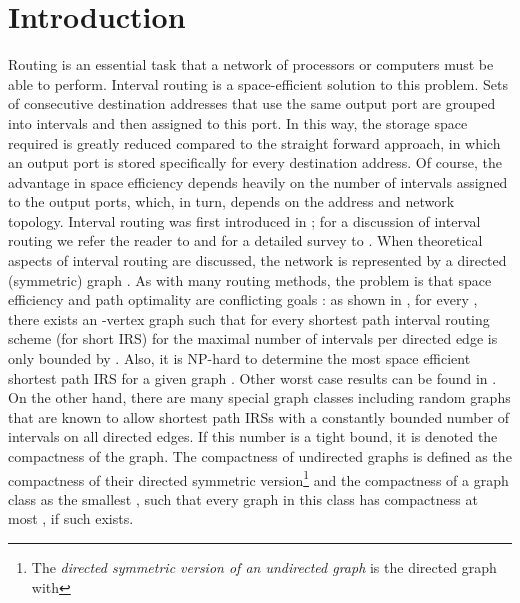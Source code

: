\documentclass[10pt]{article}
\begin{document}
\section{Introduction}











Routing is an essential task that a network of processors or computers must be able to 
perform. Interval routing is a space-efficient solution to this problem.
Sets of consecutive destination addresses that use the same output port are grouped into 
intervals and then assigned to this port.
In this way, the storage space required is greatly reduced compared to the straight 
forward approach, in which an output port is stored specifically for every destination address.
Of course, the advantage in space efficiency depends heavily on the number of intervals assigned 
to the output ports, which, in turn, depends on the address and network topology.
Interval routing was first introduced in \cite{Santoro82routingwithout,Santoro85labelling}; 
for a discussion of interval routing we refer the reader 
to \cite{Leeuwen87interval,FredericksonJ88,Bakker91linearinterval} 
and for a detailed survey to \cite{Gavoille00asurvey}.
When theoretical aspects of interval routing are discussed, the network is represented 
by a directed (symmetric) graph . 
As with many routing methods, the problem is that space efficiency and path optimality are 
conflicting goals \cite{65953}: as shown in \cite{Guevremont98worstcase}, for every , 
there exists an -vertex graph  such that for every shortest 
path interval routing scheme (for short IRS) for  the maximal number of intervals per directed edge 
is only bounded by . Also, it is NP-hard to determine the most space efficient 
shortest path IRS for a given graph \cite{Eilam2002,Flammini1997}.
Other worst case results can be found in \cite{savio99onthespace}.
On the other hand, there are many special graph classes \cite{FG98} including 
random graphs \cite{GP1998} that are known to allow shortest path IRSs 
with a constantly bounded number of intervals on all directed edges. 
If this number is a tight bound, it is denoted the compactness of the graph.
The compactness of undirected graphs is defined as the compactness of their directed 
symmetric version\footnote{The \emph{directed symmetric version of an undirected graph} 
 is the directed graph  with }
and the compactness of a graph class as the smallest , such that every graph in this 
class has compactness  at most , if such  exists.
\end{document}
